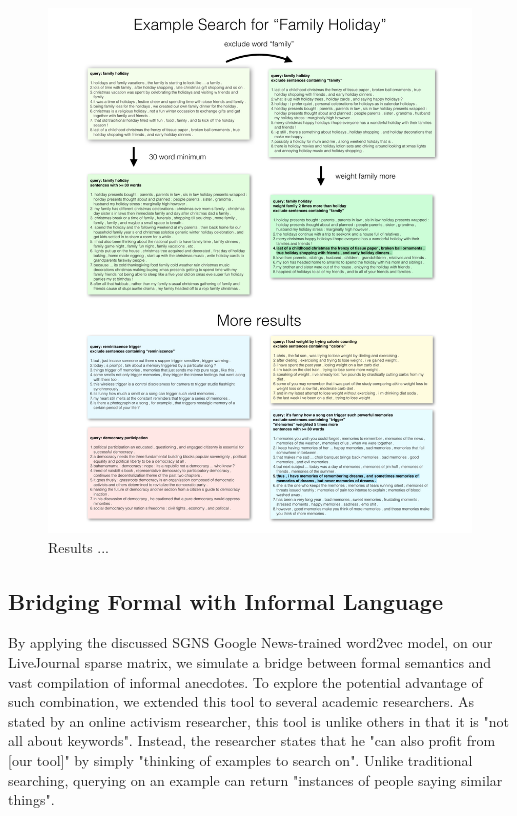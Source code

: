 \documentclass{sigchi}
\begin{document}

\begin{figure}[h!]
\centering \includegraphics[width=\textwidth]{figures/results} 
\caption{Results ... }
\end{figure}

\subsection{Bridging Formal with Informal Language}
By applying the discussed SGNS Google News-trained word2vec model, on our LiveJournal sparse matrix, we simulate a bridge between formal semantics and vast compilation of informal anecdotes. To explore the potential advantage of such combination, we extended this tool to several academic researchers. As stated by an online activism researcher, this tool is unlike others in that it is "not all about keywords". Instead, the researcher states that he "can also profit from [our tool]" by simply "thinking of examples to search on". Unlike traditional searching, querying on an example can return "instances of people saying similar things". 
\end{document}
